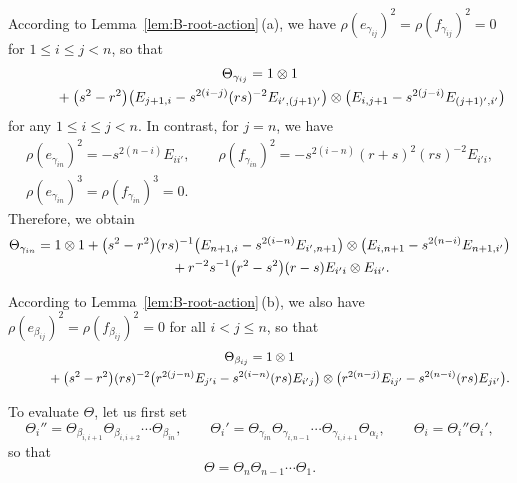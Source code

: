 \documentclass[10pt,a4paper]{amsart}
\numberwithin{equation}{section}
\begin{document}
According to Lemma~\ref{lem:B-root-action}\,(a), we have $\rho(e_{\gamma_{ij}})^{2} = \rho(f_{\gamma_{ij}})^{2} = 0$ for $1 \le i \le j < n$, so that
\begin{gather}
 \Theta_{\gamma_{ij}} = 1 \otimes 1\nonumber\\
 \hphantom{\Theta_{\gamma_{ij}} =}{}
 + \bigl(s^{2} - r^{2}\bigr)\bigl(E_{j + 1,i} - s^{2(i - j)}(rs)^{-2}E_{i',(j + 1)'}\bigr) \otimes \bigl(E_{i,j+1} - s^{2(j - i)}E_{(j + 1)',i'}\bigr)\label{eq:Theta_gamma_<n}
\end{gather}
for any $1 \le i \le j < n$. In contrast, for $j = n$, we have
\begin{gather*}
 \rho(e_{\gamma_{in}})^{2} = -s^{2(n - i)}E_{ii'}, \qquad
 \rho(f_{\gamma_{in}})^{2} = -s^{2(i - n)}(r + s)^{2}(rs)^{-2}E_{i'i}, \\
 \rho(e_{\gamma_{in}})^{3} = \rho(f_{\gamma_{in}})^{3} = 0.
\end{gather*}
Therefore, we obtain
\begin{gather}
 \Theta_{\gamma_{in}} = 1 \otimes 1
 + \bigl(s^{2} - r^{2}\bigr)(rs)^{-1} \bigl( E_{n + 1,i} - s^{2(i - n)}E_{i',n+1} \bigr) \otimes \bigl(E_{i,n+1} - s^{2(n - i)}E_{n + 1,i'}\bigr) \nonumber\\
 \hphantom{\Theta_{\gamma_{in}} =}{}
 + r^{-2}s^{-1}\bigl(r^{2} - s^{2}\bigr)(r - s) E_{i'i} \otimes E_{ii'}.\label{eq:Theta_gamma_n}
\end{gather}

According to Lemma~\ref{lem:B-root-action}\,(b), we also have $\rho(e_{\beta_{ij}})^{2} = \rho(f_{\beta_{ij}})^{2} = 0$ for all $i < j\leq n$, so that
\begin{gather*}
 \Theta_{\beta_{ij}} = 1 \otimes 1\\
 \hphantom{\Theta_{\beta_{ij}} =}{}
 +\bigl(s^{2} - r^{2}\bigr)(rs)^{-2} \bigl( r^{2(j - n)}E_{j'i} - s^{2(i - n)}(rs)E_{i'j} \bigr) \otimes \bigl(r^{2(n - j)}E_{ij'} - s^{2(n - i)}(rs)E_{ji'}\bigr).
\end{gather*}

To evaluate $\Theta$, let us first set
\begin{displaymath}
 \Theta_{i}'' = \Theta_{\beta_{i,i + 1}}\Theta_{\beta_{i,i + 2}}\cdots \Theta_{\beta_{in}}, \qquad
 \Theta_{i}' = \Theta_{\gamma_{in}}\Theta_{\gamma_{i,n-1}} \cdots \Theta_{\gamma_{i,i+1}}\Theta_{\alpha_{i}}, \qquad
 \Theta_{i} = \Theta_{i}''\Theta_{i}' ,
\end{displaymath}
so that
\begin{displaymath}
 \Theta = \Theta_{n}\Theta_{n-1}\cdots \Theta_{1}.
\end{displaymath}
\end{document}
